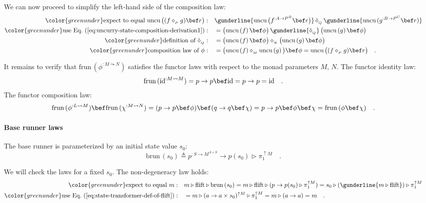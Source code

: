 We can now proceed to simplify the left-hand side of the composition
law:
\begin{align*}
{\color{greenunder}\text{expect to equal }\text{uncu}\,\big((f\diamond_{_{P}}g)\bef r\big):}\quad & \gunderline{\text{uncu}\,\big(f^{:A\rightarrow P^{B}}\bef r\big)}\,\tilde{\diamond}_{_{Q}}\,\gunderline{\text{uncu}\,(g^{:B\rightarrow P^{C}}\bef r)}\\
{\color{greenunder}\text{use Eq.~(\ref{eq:uncurry-state-composition-derivation1})}:}\quad & =\big(\text{uncu}\left(f\right)\bef\phi\big)\,\gunderline{\tilde{\diamond}_{_{Q}}}\,\big(\text{uncu}\left(g\right)\bef\phi\big)\\
{\color{greenunder}\text{definition of }\tilde{\diamond}_{_{Q}}:}\quad & =\big(\text{uncu}\left(f\right)\bef\phi\big)\diamond_{_{N}}\big(\text{uncu}\left(g\right)\bef\phi\big)\\
{\color{greenunder}\text{composition law of }\phi:}\quad & =\big(\text{uncu}\left(f\right)\diamond_{_{M}}\text{uncu}\left(g\right)\big)\bef\phi=\text{uncu}\,\big((f\diamond_{_{P}}g)\bef r\big)\quad.
\end{align*}

It remains to verify that $\text{frun}\,(\phi^{:M\leadsto N})$ satisfies
the functor laws with respect to the monad parameters $M$, $N$.
The functor identity law:
\[
\text{frun}\,(\text{id}^{:M\leadsto M})=p\rightarrow p\bef\text{id}=p\rightarrow p=\text{id}\quad.
\]
The functor composition law:
\[
\text{frun}\,(\phi^{:L\leadsto M})\bef\text{frun}\,(\chi^{:M\leadsto N})=(p\rightarrow p\bef\phi)\bef(q\rightarrow q\bef\chi)=p\rightarrow p\bef\phi\bef\chi=\text{frun}\,(\phi\bef\chi)\quad.
\]


\paragraph{Base runner laws}

The base runner is parameterized by an initial state value $s_{0}$:
\[
\text{brun}\,(s_{0})\triangleq p^{:S\rightarrow M^{A\times S}}\rightarrow p(s_{0})\triangleright\pi_{1}^{\uparrow M}\quad.
\]

We will check the laws for a fixed $s_{0}$. The non-degeneracy law
holds:
\begin{align*}
{\color{greenunder}\text{expect to equal }m:}\quad & m\triangleright\text{flift}\triangleright\text{brun}\,(s_{0})=m\triangleright\text{flift}\triangleright(p\rightarrow p(s_{0})\triangleright\pi_{1}^{\uparrow M})=s_{0}\triangleright(\gunderline{m\triangleright\text{flift}})\triangleright\pi_{1}^{\uparrow M}\\
{\color{greenunder}\text{use Eq.~(\ref{eq:state-transformer-def-of-flift})}:}\quad & =m\triangleright(a\rightarrow a\times s_{0})^{\uparrow M}\triangleright\pi_{1}^{\uparrow M}=m\triangleright(a\rightarrow a)=m\quad.
\end{align*}

